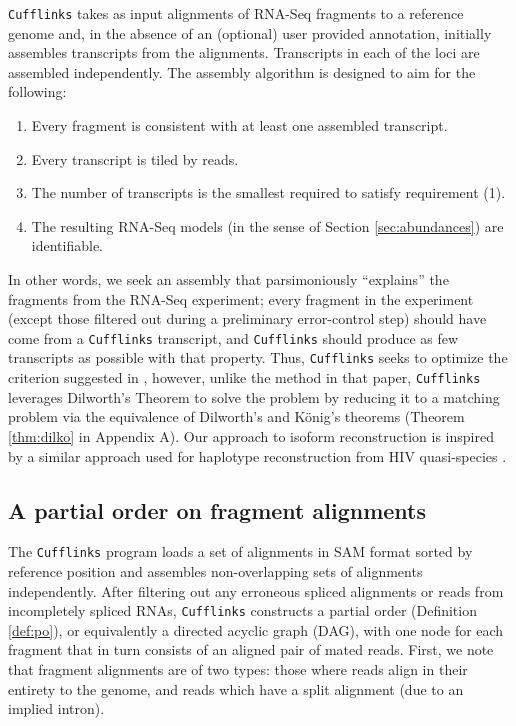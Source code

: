 \documentclass[12pt]{amsart}
\theoremstyle{definition}
\begin{document}
{\tt Cufflinks} takes as input alignments of RNA-Seq fragments to a reference
genome and, in the absence of an (optional) user provided annotation, initially assembles transcripts from the alignments. Transcripts in
each of the loci are assembled independently. The assembly algorithm
is designed to aim for the following:
\begin{enumerate}
\item Every fragment is consistent with at least one assembled
  transcript.
\item Every transcript is tiled by reads.
\item The number of transcripts is the smallest required to satisfy requirement (1).
\item The resulting RNA-Seq models (in the sense of Section \ref{sec:abundances}) are identifiable.
\end{enumerate}
In other words, we seek an assembly that parsimoniously “explains” the fragments from the RNA-Seq experiment; every
fragment in the experiment (except those filtered out during a preliminary
error-control step) should have come from a {\tt Cufflinks} transcript, and
{\tt Cufflinks} should produce as few transcripts as possible with that property.
Thus, {\tt Cufflinks} seeks to optimize the criterion suggested in \cite{Xing2004},
however, unlike the method in that paper, {\tt Cufflinks} leverages Dilworth's
Theorem \cite{Dilworth1950} to solve the problem by reducing it
to a matching problem via the equivalence of Dilworth's and K\"{o}nig's theorems (Theorem \ref{thm:dilko} in Appendix A). Our approach to isoform reconstruction is inspired by a similar approach used for haplotype reconstruction from HIV quasi-species \cite{Eriksson2008}.

\subsection{A partial order on fragment alignments}

The {\tt Cufflinks} program loads a set of alignments in SAM format sorted by reference
position and assembles non-overlapping sets of alignments independently. After
filtering out any erroneous spliced alignments or reads from incompletely
spliced RNAs, {\tt Cufflinks} constructs a partial order (Definition \ref{def:po}), or equivalently a directed acyclic graph (DAG), with
one node for each fragment that in turn consists of an aligned pair of mated reads. First, we note that fragment alignments are of two types: those where reads align in their entirety to the genome, and reads which have a split alignment (due to an implied intron). 
\end{document}
